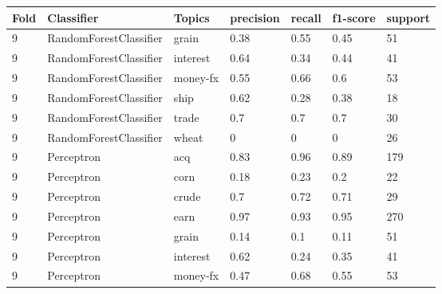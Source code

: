 \documentclass{article}
\begin{document}
\begin{table}[H]
\begin{tabular}{lllllll}
\textbf{Fold} & \textbf{Classifier}    & \textbf{Topics} & \textbf{precision} & \textbf{recall} & \textbf{f1-score} & \textbf{support} \\ \hline
9             & RandomForestClassifier & grain           & 0.38               & 0.55            & 0.45              & 51               \\
9             & RandomForestClassifier & interest        & 0.64               & 0.34            & 0.44              & 41               \\
9             & RandomForestClassifier & money-fx        & 0.55               & 0.66            & 0.6               & 53               \\
9             & RandomForestClassifier & ship            & 0.62               & 0.28            & 0.38              & 18               \\
9             & RandomForestClassifier & trade           & 0.7                & 0.7             & 0.7               & 30               \\
9             & RandomForestClassifier & wheat           & 0                  & 0               & 0                 & 26               \\
9             & Perceptron             & acq             & 0.83               & 0.96            & 0.89              & 179              \\
9             & Perceptron             & corn            & 0.18               & 0.23            & 0.2               & 22               \\
9             & Perceptron             & crude           & 0.7                & 0.72            & 0.71              & 29               \\
9             & Perceptron             & earn            & 0.97               & 0.93            & 0.95              & 270              \\
9             & Perceptron             & grain           & 0.14               & 0.1             & 0.11              & 51               \\
9             & Perceptron             & interest        & 0.62               & 0.24            & 0.35              & 41               \\
9             & Perceptron             & money-fx        & 0.47               & 0.68            & 0.55              & 53               \\

\end{tabular}
\end{table}
\end{document}
